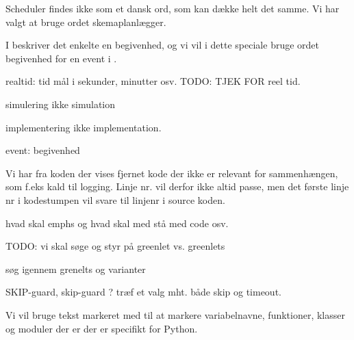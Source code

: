 \begin{list}{}{}
\tightlist
\item Scheduler findes ikke som et dansk ord, som kan  dække helt det samme. Vi har valgt at bruge ordet skemaplanlægger.
\item I \des beskriver det enkelte  en begivenhed, og vi vil i dette speciale bruge ordet begivenhed for en event i \des. 
\item realtid: tid mål i sekunder, minutter osv. TODO: TJEK FOR reel tid.
\item simulering ikke simulation
\item implementering ikke implementation.
\item event: begivenhed
\item Vi har fra koden der vises fjernet kode der ikke er relevant for sammenhængen, som f.eks kald til logging. Linje nr. vil derfor ikke altid passe, men det første linje nr i kodestumpen vil svare til linjenr i source koden.
\item hvad skal emphs og hvad skal med stå med code osv.
\item TODO: vi skal søge og styr på  greenlet vs. greenlets
\item søg igennem grenelts og varianter
\item SKIP-guard, skip-guard ? træf et valg mht. både skip og timeout. 
\end{list}


Vi vil bruge tekst markeret med  til at markere variabelnavne, funktioner,  klasser og moduler  der er  der er specifikt for Python.


